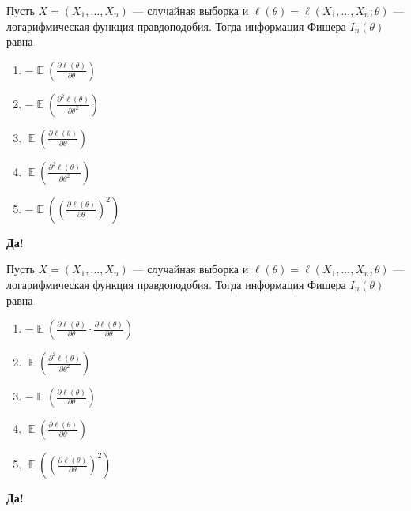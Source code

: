 \documentclass[t]{beamer}
\DeclareMathOperator{\E}{\mathbb{E}}
\begin{document}
 \begin{frame} \label{50-Yes} 
\begin{block}{50} 

Пусть $X = (X_1, \ldots , X_n)$ — случайная выборка и $\ell(\theta) = \ell(X_1, ... , X_n; \theta)$ — логарифмическая функция правдоподобия. Тогда информация Фишера $I_n(\theta)$ равна
  


 \end{block} 
\begin{enumerate} 
\item[] \hyperlink{50-No}{\beamergotobutton{} $-\E \left( \frac{\partial \ell (\theta)}{\partial \theta} \right)$}
\item[] \hyperlink{50-Yes}{\beamergotobutton{} $-\E \left( \frac{\partial^2 \ell (\theta)}{\partial \theta^2} \right)$}
\item[] \hyperlink{50-No}{\beamergotobutton{} $\E \left( \frac{\partial \ell (\theta)}{\partial \theta} \right)$}
\item[] \hyperlink{50-No}{\beamergotobutton{} $\E \left( \frac{\partial^2 \ell (\theta)}{\partial \theta^2} \right)$}
\item[] \hyperlink{50-No}{\beamergotobutton{} $-\E \left( \left( \frac{\partial \ell (\theta)}{\partial \theta} \right) ^2 \right)$}
\end{enumerate} 

 \textbf{Да!} 
 \hyperlink{51}{}\end{frame} 


 \begin{frame} \label{51-Yes} 
\begin{block}{51} 

Пусть $X = (X_1, \ldots , X_n)$ — случайная выборка и $\ell(\theta) = \ell(X_1, ... , X_n; \theta)$ — логарифмическая функция правдоподобия. Тогда информация Фишера $I_n(\theta)$ равна
  


 \end{block} 
\begin{enumerate} 
\item[] \hyperlink{51-No}{\beamergotobutton{} $- \E \left( \frac{\partial \ell (\theta)}{\partial \theta} \cdot \frac{\partial \ell (\theta)}{\partial \theta} \right)$}
\item[] \hyperlink{51-No}{\beamergotobutton{} $ \E \left( \frac{\partial^2 \ell (\theta)}{\partial \theta^2} \right)$}
\item[] \hyperlink{51-No}{\beamergotobutton{} $- \E \left( \frac{\partial \ell (\theta)}{\partial \theta} \right)$}
\item[] \hyperlink{51-No}{\beamergotobutton{} $\E \left( \frac{\partial \ell (\theta)}{\partial \theta} \right)$}
\item[] \hyperlink{51-Yes}{\beamergotobutton{} $\E \left( \left( \frac{\partial \ell (\theta)}{\partial \theta} \right) ^2 \right)$}
\end{enumerate} 

 \textbf{Да!} 
 \hyperlink{52}{}\end{frame} 
\end{document}
